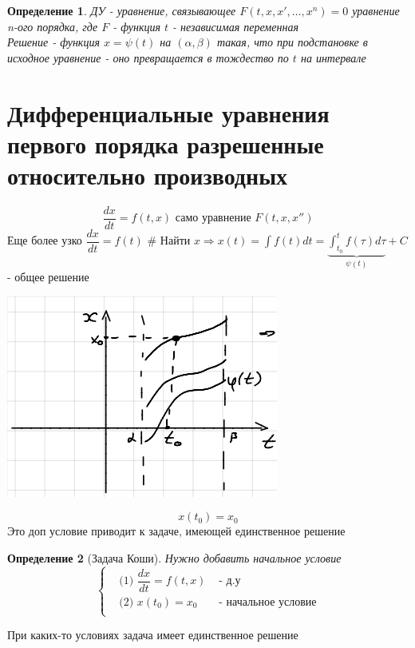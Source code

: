 \documentclass[12pt,a4paper,hidelinks]{article}            %
\newcommand{\dd}[2]{\dfrac{d #1}{d #2}}
\newtheorem*{mdef}{Определение}
\begin{document}

\newpage
\begin{mdef}
    ДУ - уравнение, связывающее $F(t,x,x',\ldots,x^{n})=0$ уравнение n-ого порядка, где $F$ - функция $t$ - независимая переменная \\
    Решение - функция $x=\psi(t)$ на $(\alpha,\beta)$ такая, что при подстановке в исходное уравнение - оно превращается в тождество по $t$ на интервале
\end{mdef}

\section{Дифференциальные уравнения первого порядка разрешенные относительно производных}
\begin{equation}\tag{1}\label{eq:1}
    \dd{x}{t}=f(t,x) \mbox{ само уравнение $F(t,x,x'')$}
\end{equation}
Еще более узко $\dd{x}{t}=f(t)$ \# Найти $x\Longrightarrow x(t)=\int f(t)dt=\underbrace{\int^{t}_{t_{0}}f(\tau)d\tau}_{\psi(t)}+C$ - общее решение
\begin{center}
	\includegraphics[scale=0.7]{images/graph1}
\end{center}
\begin{equation}\tag{2}
  x(t_0)=x_0
\end{equation}
Это доп условие приводит к задаче, имеющей единственное решение
\begin{mdef}[Задача Коши]
	Нужно добавить начальное условие
	$$ 
	   \left\{
	   \begin{aligned}
	   &\mbox{(1) } \dd{x}{t}=f(t,x)&\mbox{ - д.у}\\
	   &\mbox{(2) } x(t_0)=x_0&\mbox{ - начальное условие}\\
	   \end{aligned}
	   \right. 
	$$
\end{mdef}
При каких-то условиях задача имеет единственное решение
\end{document}
